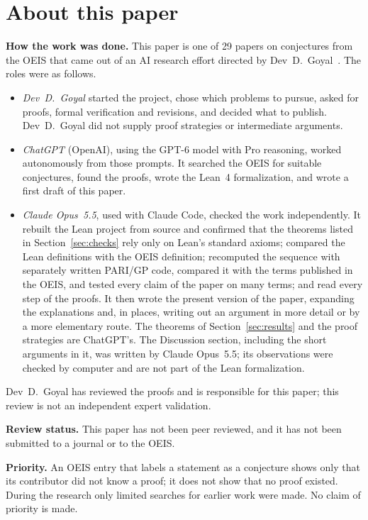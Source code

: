 \documentclass[11pt,a4paper]{article}
\theoremstyle{definition}
\theoremstyle{remark}
\newcommand{\para}[1]{\par\medskip\noindent\textbf{#1}\enspace}
\begin{document}
\section*{About this paper}\label{sec:about}
\para{How the work was done.}
This paper is one of 29 papers on conjectures from the OEIS that came out of an AI research effort directed by
Dev~D.~Goyal~\cite{repo}. The roles were as follows.
\begin{itemize}
\item \emph{Dev~D.~Goyal} started the project, chose which problems to pursue, asked for proofs, formal verification and
revisions, and decided what to publish. Dev~D.~Goyal did not supply proof strategies or intermediate arguments.
\item \emph{ChatGPT} (OpenAI), using the GPT-6 model with Pro reasoning, worked autonomously from those prompts. It
searched the OEIS for suitable conjectures, found the proofs, wrote the Lean~4 formalization, and wrote a first draft
of this paper.
\item \emph{Claude Opus~5.5}, used with Claude Code, checked the work independently. It rebuilt the Lean project from source and confirmed that the theorems listed in Section~\ref{sec:checks} rely only on
Lean's standard axioms; compared the Lean definitions with the OEIS definition; recomputed the sequence with separately
written PARI/GP code, compared it with the terms published in the OEIS, and tested every claim of the paper on many
terms; and read every step of the proofs. It then wrote the present version of the paper, expanding the
explanations and, in places, writing out an argument in more detail or by a more elementary route. The theorems of
Section~\ref{sec:results} and the proof strategies are ChatGPT's. The Discussion section, including the short arguments
in it, was written by Claude Opus~5.5; its observations were checked by computer and are not part of the Lean
formalization.
\end{itemize}
Dev~D.~Goyal has reviewed the proofs and is responsible for this paper; this review is not an independent expert
validation.

\para{Review status.} This paper has not been peer reviewed, and it has not been submitted to a journal or to the OEIS.

\para{Priority.} An OEIS entry that labels a statement as a conjecture shows only that its contributor did not know
a proof; it does not show that no proof existed. During the research only limited searches for earlier work were
made. No claim of priority is made.
\end{document}
